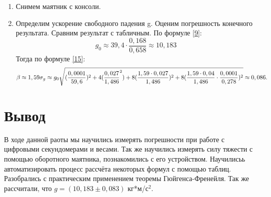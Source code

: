 \documentclass[a4paper, 12pt]{article}
\begin{document}
\begin{enumerate}
    \item Снимем маятник с консоли.    
    \item Определим ускорение свободного падения g. Оценим погрешность конечного результата. Сравним результат с табличным.\newline
    По формуле \ref{9}:\newline
    \begin{equation*}
        g_0\approx 39,4\cdot\frac{0,168}{0,658} \approx 10,183
    \end{equation*}
    Тогда по формуле \ref{15}:
    \begin{equation*}
        \beta \approx 1,59\\
        \sigma_g \approx g_0\sqrt{ (\frac{0,0001}{59,6})^2 + 4(\frac{0,027}{1,486}^2) +8(\frac{1,59 \cdot0,027}{1,486})^2 +8(\frac{1,59\cdot0,04}{1,486} \cdot \frac{0,0001}{0,278})^2 } \approx 0,086 .
    \end{equation*}

    
\end{enumerate}

\section{Вывод}
В ходе данной раоты мы научились измерять погрешности при работе с цифровыми секундомерами и весами. Так же научились измерять силу тяжести с помощью оборотного маятника, познакомились с его устройством. Научилисьь автоматизировать процесс рассчёта некоторых формул с помощью таблиц. Разобрались с практическим применением теоремы Гюйгенса-Френейля. \newline
Так же рассчитали, что $g=(10,183\pm 0,083)$ кг*м/с$^2$.
\newpage
\end{document}
